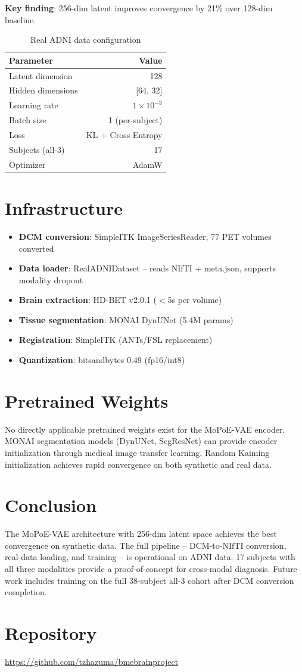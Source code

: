 \documentclass[11pt,a4paper]{article}
\begin{document}
\textbf{Key finding}: 256-dim latent improves convergence by 21\% over 128-dim baseline.

\begin{table}[H]
\centering
\caption{Real ADNI data configuration}
\begin{tabular}{lr}
\toprule
\textbf{Parameter} & \textbf{Value} \\
\midrule
Latent dimension & 128 \\
Hidden dimensions & [64, 32] \\
Learning rate & $1\times10^{-3}$ \\
Batch size & 1 (per-subject) \\
Loss & KL + Cross-Entropy \\
Subjects (all-3) & 17 \\
Optimizer & AdamW \\
\bottomrule
\end{tabular}
\end{table}

\section{Infrastructure}
\begin{itemize}
\item \textbf{DCM conversion}: SimpleITK ImageSeriesReader, 77 PET volumes converted
\item \textbf{Data loader}: RealADNIDataset -- reads NIfTI + meta.json, supports modality dropout
\item \textbf{Brain extraction}: HD-BET v2.0.1 ($<$5s per volume)
\item \textbf{Tissue segmentation}: MONAI DynUNet (5.4M params)
\item \textbf{Registration}: SimpleITK (ANTs/FSL replacement)
\item \textbf{Quantization}: bitsandbytes 0.49 (fp16/int8)
\end{itemize}

\section{Pretrained Weights}
No directly applicable pretrained weights exist for the MoPoE-VAE encoder. MONAI segmentation models (DynUNet, SegResNet) can provide encoder initialization through medical image transfer learning. Random Kaiming initialization achieves rapid convergence on both synthetic and real data.

\section{Conclusion}
The MoPoE-VAE architecture with 256-dim latent space achieves the best convergence on synthetic data. The full pipeline -- DCM-to-NIfTI conversion, real-data loading, and training -- is operational on ADNI data. 17 subjects with all three modalities provide a proof-of-concept for cross-modal diagnosis. Future work includes training on the full 38-subject all-3 cohort after DCM conversion completion.

\section{Repository}
\url{https://github.com/tzhazuma/bmebrainproject}
\end{document}

